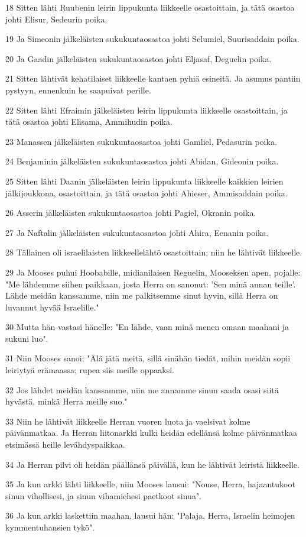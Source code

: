 \par 18 Sitten lähti Ruubenin leirin lippukunta liikkeelle osastoittain, ja tätä osastoa johti Elisur, Sedeurin poika.
\par 19 Ja Simeonin jälkeläisten sukukuntaosastoa johti Selumiel, Suurisaddain poika.
\par 20 Ja Gaadin jälkeläisten sukukuntaosastoa johti Eljasaf, Deguelin poika.
\par 21 Sitten lähtivät kehatilaiset liikkeelle kantaen pyhiä esineitä. Ja asumus pantiin pystyyn, ennenkuin he saapuivat perille.
\par 22 Sitten lähti Efraimin jälkeläisten leirin lippukunta liikkeelle osastoittain, ja tätä osastoa johti Elisama, Ammihudin poika.
\par 23 Manassen jälkeläisten sukukuntaosastoa johti Gamliel, Pedasurin poika.
\par 24 Benjaminin jälkeläisten sukukuntaosastoa johti Abidan, Gideonin poika.
\par 25 Sitten lähti Daanin jälkeläisten leirin lippukunta liikkeelle kaikkien leirien jälkijoukkona, osastoittain, ja tätä osastoa johti Ahieser, Ammisaddain poika.
\par 26 Asserin jälkeläisten sukukuntaosastoa johti Pagiel, Okranin poika.
\par 27 Ja Naftalin jälkeläisten sukukuntaosastoa johti Ahira, Eenanin poika.
\par 28 Tällainen oli israelilaisten liikkeellelähtö osastoittain; niin he lähtivät liikkeelle.
\par 29 Ja Mooses puhui Hoobabille, midianilaisen Reguelin, Mooseksen apen, pojalle: "Me lähdemme siihen paikkaan, josta Herra on sanonut: 'Sen minä annan teille'. Lähde meidän kanssamme, niin me palkitsemme sinut hyvin, sillä Herra on luvannut hyvää Israelille."
\par 30 Mutta hän vastasi hänelle: "En lähde, vaan minä menen omaan maahani ja sukuni luo".
\par 31 Niin Mooses sanoi: "Älä jätä meitä, sillä sinähän tiedät, mihin meidän sopii leiriytyä erämaassa; rupea siis meille oppaaksi.
\par 32 Jos lähdet meidän kanssamme, niin me annamme sinun saada osasi siitä hyvästä, minkä Herra meille suo."
\par 33 Niin he lähtivät liikkeelle Herran vuoren luota ja vaelsivat kolme päivänmatkaa. Ja Herran liitonarkki kulki heidän edellänsä kolme päivänmatkaa etsimässä heille levähdyspaikkaa.
\par 34 Ja Herran pilvi oli heidän päällänsä päivällä, kun he lähtivät leiristä liikkeelle.
\par 35 Ja kun arkki lähti liikkeelle, niin Mooses lausui: "Nouse, Herra, hajaantukoot sinun vihollisesi, ja sinun vihamiehesi paetkoot sinua".
\par 36 Ja kun arkki laskettiin maahan, lausui hän: "Palaja, Herra, Israelin heimojen kymmentuhansien tykö".

